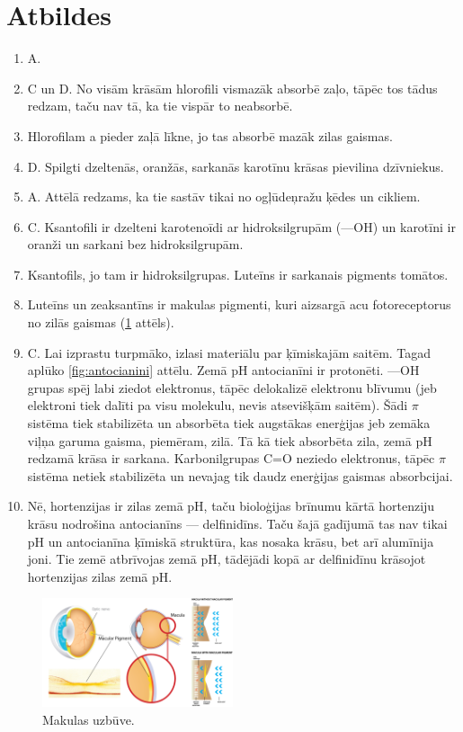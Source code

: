 \documentclass[12pt,a4paper]{article}
\newcommand{\figref}[1]{\ref{#1} attēls}
\begin{document}
\newpage
\section*{Atbildes}

\begin{enumerate}
\item A.
\item C un D. No visām krāsām hlorofili vismazāk absorbē zaļo, tāpēc tos tādus redzam, taču nav tā, ka tie vispār to neabsorbē.
\item Hlorofilam a pieder zaļā līkne, jo tas absorbē mazāk zilas gaismas.
\item D. Spilgti dzeltenās, oranžās, sarkanās karotīnu krāsas pievilina dzīvniekus.
\item A. Attēlā redzams, ka tie sastāv tikai no ogļūdeņražu ķēdes un cikliem.
\item C. Ksantofili ir dzelteni karotenoīdi ar hidroksilgrupām (—OH) un karotīni ir oranži un sarkani bez hidroksilgrupām.
\item Ksantofils, jo tam ir hidroksilgrupas. Luteīns ir sarkanais pigments tomātos.
\item Luteīns un zeaksantīns ir makulas pigmenti, kuri aizsargā acu fotoreceptorus no zilās gaismas (\figref{fig:makula}).
\item C. Lai izprastu turpmāko, izlasi materiālu par ķīmiskajām saitēm. Tagad aplūko \ref{fig:antocianini} attēlu. Zemā pH antocianīni ir protonēti. —OH grupas spēj labi ziedot elektronus, tāpēc delokalizē elektronu blīvumu (jeb elektroni tiek dalīti pa visu molekulu, nevis atsevišķām saitēm). Šādi $\pi$ sistēma tiek stabilizēta un absorbēta tiek augstākas enerģijas jeb zemāka viļņa garuma gaisma, piemēram, zilā. Tā kā tiek absorbēta zila, zemā pH redzamā krāsa ir sarkana. Karbonilgrupas C=O neziedo elektronus, tāpēc $\pi$ sistēma netiek stabilizēta un nevajag tik daudz enerģijas gaismas absorbcijai.
\item Nē, hortenzijas ir zilas zemā pH, taču bioloģijas brīnumu kārtā hortenziju krāsu nodrošina antocianīns — delfinidīns. Taču šajā gadījumā tas nav tikai pH un antocianīna ķīmiskā struktūra, kas nosaka krāsu, bet arī alumīnija joni. Tie zemē atbrīvojas zemā pH, tādējādi kopā ar delfinidīnu krāsojot hortenzijas zilas zemā pH.

\end{enumerate}

\begin{figure}[H]
    \centering
    \includegraphics[width=0.5\textwidth]{atteli/makula.png}
    \caption{Makulas uzbūve.}
    \label{fig:makula}
\end{figure}
\end{document}
